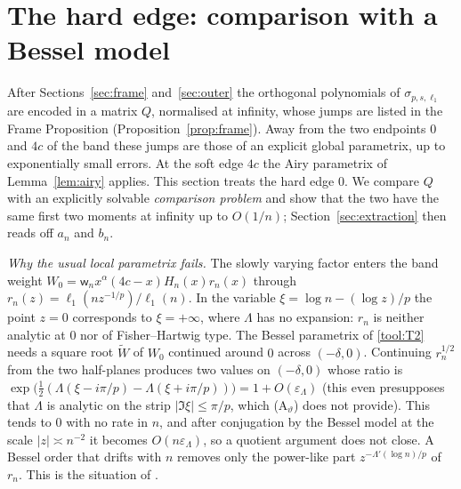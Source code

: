 \providecommand{\Cauchy}{\mathcal{C}}
\providecommand{\dC}{\partial\mathcal{C}}
\providecommand{\Sighat}{\hat\Sigma}
\providecommand{\Sigcirc}{\Sigma_{\circ}}
\providecommand{\Fi}[1]{\textup{(F#1)}}
\providecommand{\Ath}[1]{\textup{(A$_{#1}$)}}
\providecommand{\varthetalip}{\vartheta_{\mathrm{lip}}}
\providecommand{\thw}{\vartheta_{\mathrm{w}}}
\providecommand{\Pinfz}{P^\infty_0}
\providecommand{\Phat}{\hat P}
\providecommand{\Ehat}{\hat E_n}
\providecommand{\epsp}{\varepsilon'_n}
\providecommand{\Hc}{H^{\circ}_n}

\section{The hard edge: comparison with a Bessel model}\label{sec:hardedge}

After Sections~\ref{sec:frame} and~\ref{sec:outer} the orthogonal polynomials of $\sigma_{p,s,\ell_1}$ are encoded in a
matrix $Q$, normalised at infinity, whose jumps are listed in the Frame Proposition (Proposition~\ref{prop:frame}).
Away from the two endpoints $0$ and $4c$ of the band these jumps are those of an explicit global parametrix, up to
exponentially small errors. At the soft edge $4c$ the Airy parametrix of Lemma~\ref{lem:airy} applies. This section
treats the hard edge $0$. We compare $Q$ with an explicitly solvable \emph{comparison problem} and show that the two
have the same first two moments at infinity up to $O(1/n)$; Section~\ref{sec:extraction} then reads off $a_n$ and $b_n$.

\emph{Why the usual local parametrix fails.} The slowly varying factor enters the band weight
$W_0=\mathsf w_nx^\alpha(4c-x)H_n(x)r_n(x)$ through $r_n(z)=\ell_1(nz^{-1/p})/\ell_1(n)$. In the variable
$\xi=\log n-(\log z)/p$ the point $z=0$ corresponds to $\xi=+\infty$, where $\Lambda$ has no expansion: $r_n$ is neither
analytic at $0$ nor of Fisher--Hartwig type. The Bessel parametrix of \ref{tool:T2} needs a square root $\tilde W$ of
$W_0$ continued around $0$ across $(-\delta,0)$. Continuing $r_n^{1/2}$ from the two half-planes produces two values on
$(-\delta,0)$ whose ratio is $\exp\bigl(\frac12(\Lambda(\xi-i\pi/p)-\Lambda(\xi+i\pi/p))\bigr)=1+O(\varepsilon_\Lambda)$
(this even presupposes that $\Lambda$ is analytic on the strip $|\Im\xi|\le\pi/p$, which \Ath{\vartheta} does not
provide). This tends to $0$ with no rate in $n$, and after
conjugation by the Bessel model at the scale $|z|\asymp n^{-2}$ it becomes $O(n\varepsilon_\Lambda)$, so a quotient
argument does not close. A Bessel order that drifts with $n$ removes only the power-like part
$z^{-\Lambda'(\log n)/p}$ of $r_n$. This is the situation of \cite[Remark~4.10]{CD}.

